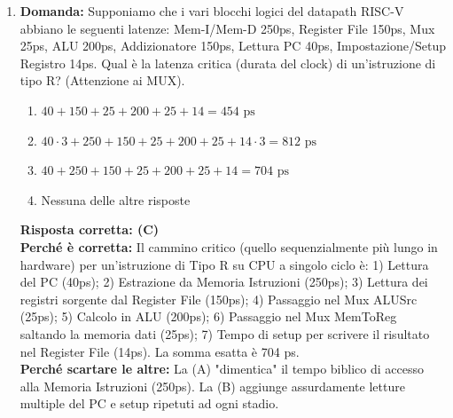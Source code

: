 \documentclass[12pt, a4paper]{article}
\begin{document}
\begin{enumerate}
\newpage

    \textbf{Risposta corretta: (A)} \\
    \textbf{Perché è corretta:} In una tipica istruzione R, la destinazione è il registro estratto dal campo specifico dell'istruzione (\texttt{RegDst} = 1). Il secondo operando della ALU proviene dal banco dei registri e non dall'immediato (\texttt{ALUSrc} = 0). Bisogna ovviamente scrivere il risultato finale (\texttt{RegWrite} = 1). Il dato da salvare non proviene dalla memoria, bensì direttamente dalla ALU (\texttt{MemToReg} = 0). L'\texttt{AluOp} classico assegnato a queste istruzioni dall'Unità di Controllo per abilitare la decodifica fine è \texttt{10}. \\
    \textbf{Perché scartare le altre:} La (B) usa \texttt{AluOp = 01}, che è riservato ai Branch condizionati. La (C) setta erroneamente \texttt{ALUSrc = 1}, che farebbe entrare nella ALU il valore immediato esteso in segno (tipico delle istruzioni di Load/Store o I-Type).

    \item \textbf{Domanda:} Supponiamo che i vari blocchi logici del datapath RISC-V abbiano le seguenti latenze: Mem-I/Mem-D 250ps, Register File 150ps, Mux 25ps, ALU 200ps, Addizionatore 150ps, Lettura PC 40ps, Impostazione/Setup Registro 14ps. Qual è la latenza critica (durata del clock) di un'istruzione di tipo R? (Attenzione ai MUX).
    \begin{enumerate}[label=(\Alph*)]
        \item $40 + 150 + 25 + 200 + 25 + 14 = 454\text{ ps}$
        \item $40 \cdot 3 + 250 + 150 + 25 + 200 + 25 + 14 \cdot 3 = 812\text{ ps}$
        \item $40 + 250 + 150 + 25 + 200 + 25 + 14 = 704\text{ ps}$
        \item Nessuna delle altre risposte
    \end{enumerate}
    \textbf{Risposta corretta: (C)} \\
    \textbf{Perché è corretta:} Il cammino critico (quello sequenzialmente più lungo in hardware) per un'istruzione di Tipo R su CPU a singolo ciclo è: 1) Lettura del PC (40ps); 2) Estrazione da Memoria Istruzioni (250ps); 3) Lettura dei registri sorgente dal Register File (150ps); 4) Passaggio nel Mux ALUSrc (25ps); 5) Calcolo in ALU (200ps); 6) Passaggio nel Mux MemToReg saltando la memoria dati (25ps); 7) Tempo di setup per scrivere il risultato nel Register File (14ps). La somma esatta è 704 ps. \\
    \textbf{Perché scartare le altre:} La (A) "dimentica" il tempo biblico di accesso alla Memoria Istruzioni (250ps). La (B) aggiunge assurdamente letture multiple del PC e setup ripetuti ad ogni stadio.


\end{enumerate}
\end{document}
